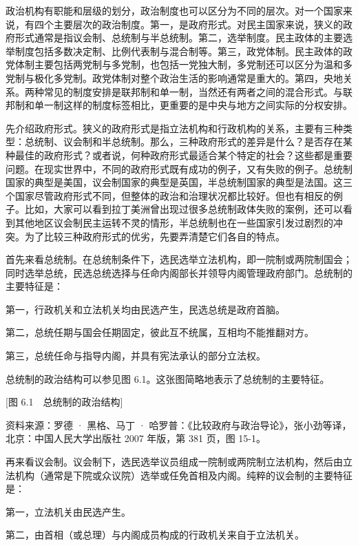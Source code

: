 
政治机构有职能和层级的划分，政治制度也可以区分为不同的层次。对一个国家来说，有四个主要层次的政治制度。第一，是政府形式。对民主国家来说，狭义的政府形式通常是指议会制、总统制与半总统制。第二，选举制度。民主政体的主要选举制度包括多数决定制、比例代表制与混合制等。第三，政党体制。民主政体的政党体制主要包括两党制与多党制，也包括一党独大制，多党制还可以区分为温和多党制与极化多党制。政党体制对整个政治生活的影响通常是重大的。第四，央地关系。两种常见的制度安排是联邦制和单一制，当然还有两者之间的混合形式。与联邦制和单一制这样的制度标签相比，更重要的是中央与地方之间实际的分权安排。

先介绍政府形式。狭义的政府形式是指立法机构和行政机构的关系，主要有三种类型：总统制、议会制和半总统制。那么，三种政府形式的差异是什么？是否存在某种最佳的政府形式？或者说，何种政府形式最适合某个特定的社会？这些都是重要问题。在现实世界中，不同的政府形式既有成功的例子，又有失败的例子。总统制国家的典型是美国，议会制国家的典型是英国，半总统制国家的典型是法国。这三个国家尽管政府形式不同，但整体的政治和治理状况都比较好。但也有相反的例子。比如，大家可以看到拉丁美洲曾出现过很多总统制政体失败的案例，还可以看到其他地区议会制民主运转不灵的情形，半总统制也在一些国家引发过剧烈的冲突。为了比较三种政府形式的优劣，先要弄清楚它们各自的特点。

首先来看总统制。在总统制条件下，选民选举立法机构，即一院制或两院制国会；同时选举总统，民选总统选择与任命内阁部长并领导内阁管理政府部门。总统制的主要特征是：

第一，行政机关和立法机关均由民选产生，民选总统是政府首脑。

第二，总统任期与国会任期固定，彼此互不统属，互相均不能推翻对方。

第三，总统任命与指导内阁，并具有宪法承认的部分立法权。

总统制的政治结构可以参见图 6.1。这张图简略地表示了总统制的主要特征。

[图 6.1　总统制的政治结构]

资料来源：罗德 · 黑格、马丁 · 哈罗普：《比较政府与政治导论》，张小劲等译，北京：中国人民大学出版社 2007 年版，第 381 页，图 15-1。

再来看议会制。议会制下，选民选举议员组成一院制或两院制立法机构，然后由立法机构（通常是下院或众议院）选举或任免首相及内阁。纯粹的议会制的主要特征是：

第一，立法机关由民选产生。

第二，由首相（或总理）与内阁成员构成的行政机关来自于立法机关。

